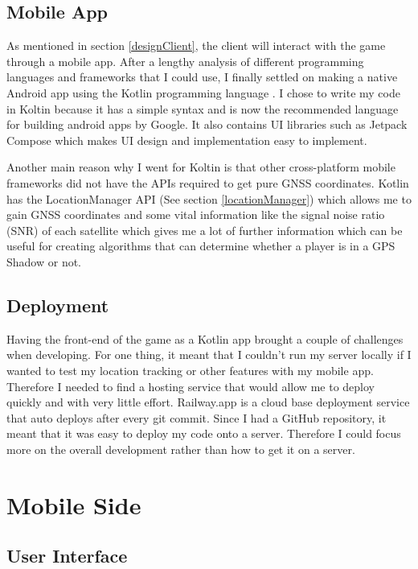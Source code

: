 \documentclass{l4proj}
\begin{document}
\subsection{Mobile App}
As mentioned in section \ref{designClient}, the client will interact with the game through a mobile app. After a lengthy
analysis of different programming languages and frameworks that I could use, I finally settled on making a native Android
app using the Kotlin programming language \citep{kotlin}. I chose to write my code in Koltin because it has a simple syntax
and is now the recommended language for building android apps by Google. It also contains UI libraries such as Jetpack Compose 
which makes UI design and implementation easy to implement.

Another main reason why I went for Koltin is that other cross-platform mobile frameworks did not have the APIs required
to get pure GNSS coordinates. Kotlin has the LocationManager API (See section \ref{locationManager}) which allows me
to gain GNSS coordinates and some vital information like the signal noise ratio (SNR) of each satellite \citep{locationManager}
which gives me a lot of further information which can be useful for creating algorithms that can determine whether a player
is in a GPS Shadow or not.

\subsection{Deployment}
\label{deployment}
Having the front-end of the game as a Kotlin app brought a couple of challenges when developing. For one thing, it meant
that I couldn't run my server locally if I wanted to test my location tracking or other features with my mobile app. Therefore
I needed to find a hosting service that would allow me to deploy quickly and with very little effort. Railway.app \citep{railway}
is a cloud base deployment service that auto deploys after every git commit. Since I had a GitHub repository, it meant that it was
easy to deploy my code onto a server. Therefore I could focus more on the overall development rather than how to get it on a server.

\section{Mobile Side}

\subsection{User Interface}
\label{implementationui}
\end{document}
